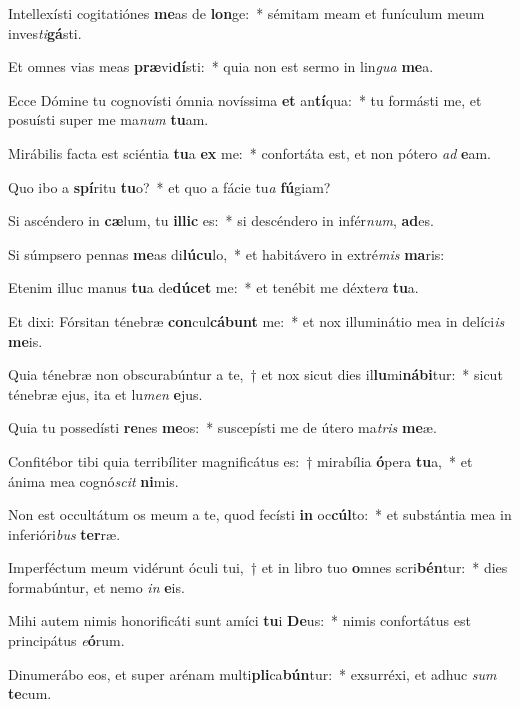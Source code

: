 \item Intellexísti cogitatiónes \textbf{me}as de \textbf{lon}ge:~* sémitam meam et funículum meum inves\textit{ti}\textbf{gá}sti.
\item Et omnes vias meas \textbf{præ}vi\textbf{dí}sti:~* quia non est sermo in lin\textit{gua} \textbf{me}a.
\item Ecce Dómine tu cognovísti ómnia novíssima \textbf{et} an\textbf{tí}qua:~* tu formásti me, et posuísti super me ma\tinyhspace\textit{num} \textbf{tu}am.
\item Mirábilis facta est sciéntia \textbf{tu}a \textbf{ex} me:~* confortáta est, et non pótero \textit{ad} \textbf{e}am.
\item Quo ibo a \textbf{spí}ritu \textbf{tu}o?~* et quo a fácie tu\tinyhspace\textit{a} \textbf{fú}giam?
\item Si ascéndero in \textbf{cæ}lum, tu \textbf{il}\textbf{lic} es:~* si descéndero in infér\textit{num}, \textbf{ad}es.
\item Si súmpsero pennas \textbf{me}as di\textbf{lú}\textbf{cu}lo,~* et habitávero in extré\textit{mis} \textbf{ma}ris:
\item Etenim illuc manus \textbf{tu}a de\textbf{dú}\textbf{cet} me:~* et tenébit me déxte\textit{ra} \textbf{tu}a.
\item Et dixi: Fórsitan ténebræ \textbf{con}cul\textbf{cá}\textbf{bunt} me:~* et nox illuminátio mea in delíci\tinyhspace\textit{is} \textbf{me}is.
\item Quia ténebræ non obscurabúntur a te,~† et nox sicut dies il\textbf{lu}mi\textbf{ná}\textbf{bi}tur:~* sicut ténebræ ejus, ita et lu\textit{men} \textbf{e}jus.
\item Quia tu possedísti \textbf{re}nes \textbf{me}os:~* suscepísti me de útero ma\textit{tris} \textbf{me}æ.
\item Confitébor tibi quia terribíliter magnificátus es:~† mirabília \textbf{ó}pera \textbf{tu}a,~* et ánima mea cognó\textit{scit} \textbf{ni}mis.
\item Non est occultátum os meum a te, quod fecísti \textbf{in} oc\textbf{cúl}to:~* et substántia mea in inferióri\textit{bus} \textbf{ter}ræ.
\item Imperféctum meum vidérunt óculi tui,~† et in libro tuo \textbf{o}mnes scri\textbf{bén}tur:~* dies formabúntur, et nemo \textit{in} \textbf{e}is.
\item Mihi autem nimis honorificáti sunt amíci \textbf{tu}i \textbf{De}us:~* nimis confortátus est principátus \textit{e}\textbf{ó}rum.
\item Dinumerábo eos, et super arénam multi\textbf{pli}ca\textbf{bún}tur:~* exsurréxi, et adhuc \textit{sum} \textbf{te}cum.
